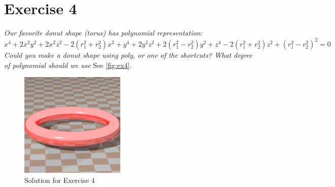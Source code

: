 \section{Exercise 4}
\textit{Our favorite donut shape (torus) has polynomial representation:
$$x^4+2x^2y^2+2x^2z^2−2(r_1^2+r_2^2)x^2+y^4+2y^2z^2+2(r_1^2−r_2^2)y^2+z^4−2(r_1^2+r_2^2)z^2+(r_1^2−r_2^2)^2= 0$$
Could you make a donut shape using poly, or one of the shortcuts? What degree of polynomial should we use}
See \autoref{fig:ex4}.

\begin{figure}[h]
  \centering
  \includegraphics[height=5cm]{ex4.png}
  \caption{Solution for Exercise 4}
  \label{fig:ex4}
\end{figure}